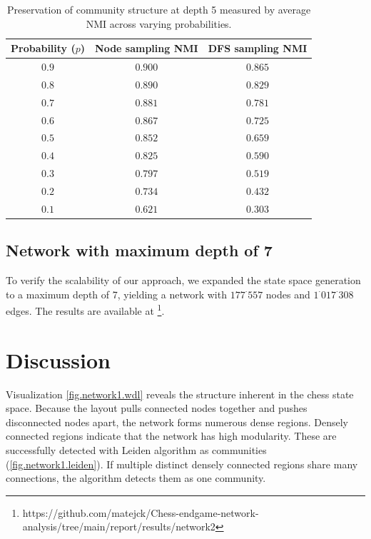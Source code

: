 \documentclass[9pt,twocolumn,twoside]{pnas-report}
\begin{document}
\begin{table}[t]
\centering
\caption{Preservation of community structure at depth 5 measured by average NMI across varying probabilities.}
\begin{tabular}{c c c}
\hline
\textbf{Probability ($p$)} & \textbf{Node sampling NMI} & \textbf{DFS sampling NMI} \\
\hline
$0.9$ & $0.900$ \raisebox{0.1ex}{\scriptsize $\pm 0.023$} & $0.865$ \raisebox{0.1ex}{\scriptsize $\pm 0.021$} \\
$0.8$ & $0.890$ \raisebox{0.1ex}{\scriptsize $\pm 0.018$} & $0.829$ \raisebox{0.1ex}{\scriptsize $\pm 0.022$} \\
$0.7$ & $0.881$ \raisebox{0.1ex}{\scriptsize $\pm 0.027$} & $0.781$ \raisebox{0.1ex}{\scriptsize $\pm 0.019$} \\
$0.6$ & $0.867$ \raisebox{0.1ex}{\scriptsize $\pm 0.022$} & $0.725$ \raisebox{0.1ex}{\scriptsize $\pm 0.021$} \\
$0.5$ & $0.852$ \raisebox{0.1ex}{\scriptsize $\pm 0.015$} & $0.659$ \raisebox{0.1ex}{\scriptsize $\pm 0.019$} \\
$0.4$ & $0.825$ \raisebox{0.1ex}{\scriptsize $\pm 0.016$} & $0.590$ \raisebox{0.1ex}{\scriptsize $\pm 0.012$} \\
$0.3$ & $0.797$ \raisebox{0.1ex}{\scriptsize $\pm 0.014$} & $0.519$ \raisebox{0.1ex}{\scriptsize $\pm 0.006$} \\
$0.2$ & $0.734$ \raisebox{0.1ex}{\scriptsize $\pm 0.012$} & $0.432$ \raisebox{0.1ex}{\scriptsize $\pm 0.005$} \\
$0.1$ & $0.621$ \raisebox{0.1ex}{\scriptsize $\pm 0.009$} & $0.303$ \raisebox{0.1ex}{\scriptsize $\pm 0.164$} \\
\hline
\end{tabular}
\label{table.network1.NMI}
\end{table}

\subsection{Network with maximum depth of 7}
To verify the scalability of our approach, we expanded the state space generation to a maximum depth of 7, yielding a network with $177 ^\cdot 557$ nodes and $1 ^\cdot 017 ^\cdot 308$ edges. The results are available at \footnote{https://github.com/matejck/Chess-endgame-network-analysis/tree/main/report/results/network2}.

\section*{Discussion}
Visualization \ref{fig.network1.wdl} reveals the structure inherent in the chess state space. Because the layout pulls connected nodes together and pushes disconnected nodes apart, the network forms numerous dense regions. Densely connected regions indicate that the network has high modularity. These are successfully detected with Leiden algorithm as communities (\ref{fig.network1.leiden}).
If multiple distinct densely connected regions share many connections, the algorithm detects them as one community. 
\end{document}
